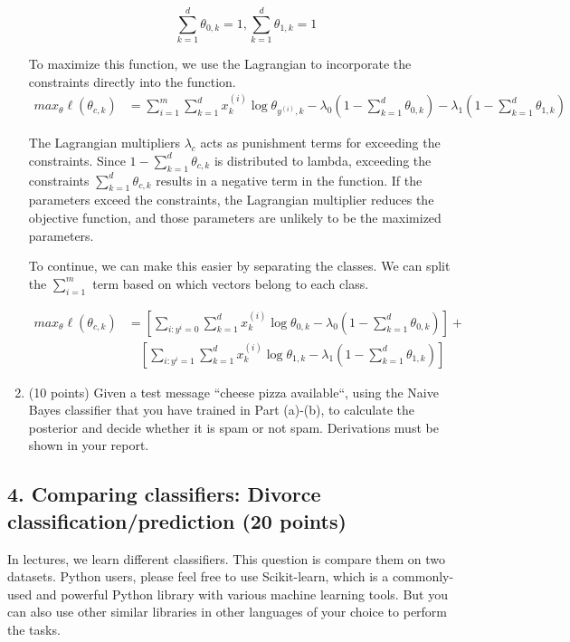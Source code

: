 \documentclass[12pt]{article}
\begin{document}
\begin{enumerate}
\[
\sum_{k=1}^d \theta_{0,k} = 1, \sum_{k=1}^d \theta_{1,k} = 1
\]

 To maximize this function, we use the Lagrangian to incorporate the constraints directly into the function. 
 \begin{align*}
    max_{\theta} \ell(\theta_{c,k}) &= \sum_{i=1}^m \sum_{k=1}^d x_k^{(i)} \log \theta_{y^{(i)}, k} - \lambda_0(1-\sum_{k=1}^d \theta_{0,k}) - \lambda_1(1-\sum_{k=1}^d \theta_{1,k})
 \end{align*}

 The Lagrangian multipliers $\lambda_c$ acts as punishment terms for exceeding the constraints. Since $1-\sum_{k=1}^d \theta_{c,k}$ is distributed to lambda, exceeding the constraints $\sum_{k=1}^d \theta_{c,k}$ results in a negative term in the function. If the parameters exceed the constraints, the Lagrangian multiplier reduces the objective function, and those parameters are unlikely to be the maximized parameters.

To continue, we can make this easier by separating the classes. We can split the $\sum_{i=1}^m$ term based on which vectors belong to each class.

\begin{align*}
        max_{\theta} \ell(\theta_{c,k}) &= [\sum_{i:y^i=0} \sum_{k=1}^d x_k^{(i)} \log \theta_{0, k}  - \lambda_0(1-\sum_{k=1}^d \theta_{0,k})] + \\ & \quad [\sum_{i:y^i=1} \sum_{k=1}^d x_k^{(i)}\log \theta_{1, k}  - \lambda_1(1-\sum_{k=1}^d \theta_{1,k})]
\end{align*}

\item (10 points) Given a test message ``\textsf{cheese pizza available}``, using the Naive Bayes classifier that you have trained in Part (a)-(b), to calculate the posterior and decide whether it is spam or not spam. Derivations must be shown in your report.

\end{enumerate}



\subsection*{4. Comparing classifiers: Divorce classification/prediction (20 points)}

In lectures, we learn different classifiers. This question is compare them on two datasets. Python users, please feel free to use \textsf{Scikit-learn}, which is a commonly-used and powerful \textsf{Python} library with various machine learning tools. But you can also use other similar libraries in other languages of your choice to perform the tasks.
\end{document}
